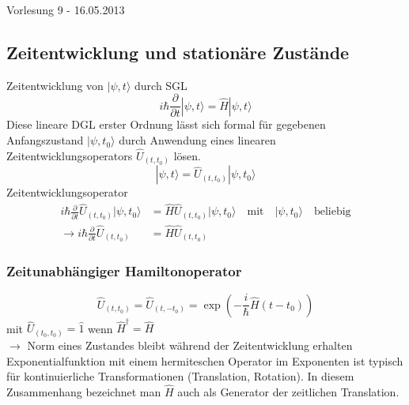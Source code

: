 \documentclass[10pt,article,colorback,accentcolor=tud9d]{scrartcl}
\begin{document}
\begin{flushright}
Vorlesung 9 - 16.05.2013
\end{flushright}

\subsection{Zeitentwicklung und stationäre Zustände}
Zeitentwicklung von $|\psi,t\rangle$ durch SGL 
\begin{equation}
i\hbar \frac{\partial}{\partial t}|\psi,t\rangle=\hat{H}|\psi,t\rangle
\label{eq:Schrödingergleichung}
\end{equation}
Diese lineare DGL erster Ordnung lässt sich formal für gegebenen Anfangszustand $|\psi,t_0\rangle$ durch Anwendung eines linearen Zeitentwicklungsoperators $\hat{U}_{(t,t_0)}$ lösen.
\begin{equation}
|\psi,t\rangle=\hat{U}_{(t,t_0)}|\psi,t_0\rangle
\end{equation}
Zeitentwicklungsoperator
\begin{align}
i\hbar\frac{\partial}{\partial t}\hat{U}_{(t,t_0)}|\psi,t_0\rangle&=\hat{H}\hat{U}_{(t,t_0)}|\psi,t_0\rangle \quad \text{mit} \quad |\psi,t_0\rangle \quad \text{beliebig}\\
\rightarrow i\hbar \frac{\partial}{\partial t}\hat{U}_{(t,t_0)}&=\hat{H}\hat{U}_{(t,t_0)}
\end{align}
\subsubsection{Zeitunabhängiger Hamiltonoperator}
\begin{equation}
\hat{U}_{(t,t_0)}=\hat{U}_{(t,-t_0)}=\exp\left(-\frac{i}{\hbar}\hat{H}(t-t_0)\right)
\end{equation}
mit $\hat{U}_{(t_0,t_0)}=\hat{1}$ wenn $\hat{H}^\dagger=\hat{H}$\\
$\rightarrow$ Norm eines Zustandes bleibt während der Zeitentwicklung erhalten\\
Exponentialfunktion mit einem hermiteschen Operator im Exponenten ist typisch für kontinuierliche Transformationen (Translation, Rotation). In diesem Zusammenhang bezeichnet man $\hat{H}$ auch als Generator der zeitlichen Translation.
\end{document}
